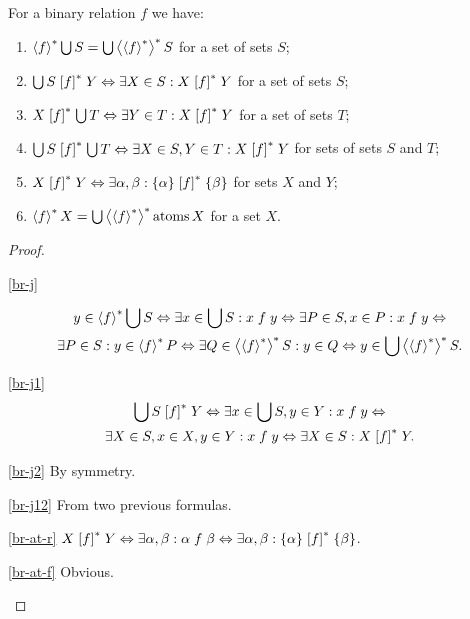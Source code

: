 \begin{prop}
For a binary relation $f$ we have:
\begin{enumerate}
\item \label{br-j}$\left\langle f\right\rangle ^{\ast}\bigcup S=\bigcup\left\langle \left\langle f\right\rangle ^{\ast}\right\rangle ^{\ast}S$ for
a set of sets $S$;
\item \label{br-j1}$\bigcup S\mathrel{\left[f\right]^{\ast}}Y\Leftrightarrow\exists X\in S:X\mathrel{\left[f\right]^{\ast}}Y$
for a set of sets $S$;
\item \label{br-j2}$X\mathrel{\left[f\right]^{\ast}}\bigcup T\Leftrightarrow\exists Y\in T:X\mathrel{\left[f\right]^{\ast}}Y$
for a set of sets $T$;
\item \label{br-j12}$\bigcup S\mathrel{\left[f\right]^{\ast}}\bigcup T\Leftrightarrow\exists X\in S,Y\in T:X\mathrel{\left[f\right]^{\ast}}Y$
for sets of sets $S$ and $T$;
\item \label{br-at-r}$X\mathrel{\left[f\right]^{\ast}}Y\Leftrightarrow\exists\alpha,\beta:\{\alpha\}\mathrel{\left[f\right]^{\ast}}\{\beta\}$
for sets $X$ and $Y$;
\item \label{br-at-f}$\left\langle f\right\rangle ^{\ast}X=\bigcup\left\langle \left\langle f\right\rangle ^{\ast}\right\rangle ^{\ast}\operatorname{atoms} X$ for a
set $X$.
\end{enumerate}
\end{prop}
\begin{proof}
~
\begin{widedisorder}
\item [{\ref{br-j}}] ~

\begin{multline*}
y\in\left\langle f\right\rangle ^{\ast}\bigcup S\Leftrightarrow\exists x\in\bigcup S:x\mathrel fy\Leftrightarrow\exists P\in S,x\in P:x\mathrel fy\Leftrightarrow\\
\exists P\in S:y\in\left\langle f\right\rangle ^{\ast}P\Leftrightarrow\exists Q\in\left\langle \left\langle f\right\rangle ^{\ast}\right\rangle ^{\ast}S:y\in Q\Leftrightarrow y\in\bigcup\left\langle \left\langle f\right\rangle ^{\ast}\right\rangle ^{\ast}S.
\end{multline*}

\item [{\ref{br-j1}}] 
\begin{multline*}
\bigcup S\mathrel{\left[f\right]^{\ast}}Y\Leftrightarrow\exists x\in\bigcup S,y\in Y:x\mathrel fy\Leftrightarrow\\
\exists X\in S,x\in X,y\in Y:x\mathrel fy\Leftrightarrow\exists X\in S:X\mathrel{\left[f\right]^{\ast}}Y.
\end{multline*}

\item [{\ref{br-j2}}] By symmetry.
\item [{\ref{br-j12}}] From two previous formulas.
\item [{\ref{br-at-r}}] $X\mathrel{\left[f\right]^{\ast}}Y\Leftrightarrow\exists\alpha,\beta:\alpha\mathrel f\beta\Leftrightarrow\exists\alpha,\beta:\{\alpha\}\mathrel{\left[f\right]^{\ast}}\{\beta\}$.
\item [\ref{br-at-f}] Obvious.
\end{widedisorder}
\end{proof}

